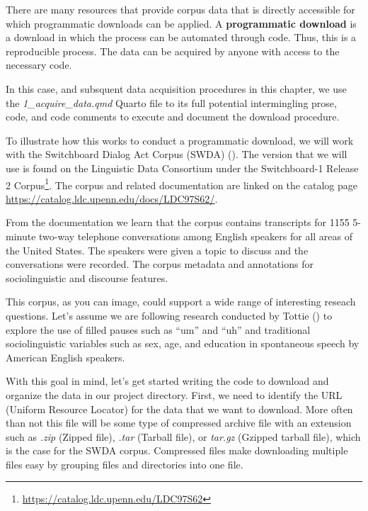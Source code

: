 \documentclass[
  letterpaper,
]{latex/krantz}
\theoremstyle{definition}
\theoremstyle{remark}
\DeclareRobustCommand{\href}[2]{#2\footnote{\url{#1}}}
\begin{document}
There are many resources that provide corpus data that is directly
accessible for which programmatic downloads can be applied. A
\textbf{programmatic download} is a download in which the process can be
automated through code. Thus, this is a reproducible process. The data
can be acquired by anyone with access to the necessary code.

In this case, and subsquent data acquisition procedures in this chapter,
we use the \emph{1\_acquire\_data.qmd} Quarto file to its full potential
intermingling prose, code, and code comments to execute and document the
download procedure.

To illustrate how this works to conduct a programmatic download, we will
work with the Switchboard Dialog Act Corpus (SWDA)
(). The
version that we will use is found on the Linguistic Data Consortium
under the \href{https://catalog.ldc.upenn.edu/LDC97S62}{Switchboard-1
Release 2 Corpus}. The corpus and related documentation are linked on
the catalog page \url{https://catalog.ldc.upenn.edu/docs/LDC97S62/}.

From the documentation we learn that the corpus contains transcripts for
1155 5-minute two-way telephone conversations among English speakers for
all areas of the United States. The speakers were given a topic to
discuss and the conversations were recorded. The corpus metadata and
annotations for sociolinguistic and discourse features.

This corpus, as you can image, could support a wide range of interesting
reseach questions. Let's assume we are following research conducted by
Tottie () to explore the use of filled
pauses such as ``um'' and ``uh'' and traditional sociolinguistic
variables such as sex, age, and education in spontaneous speech by
American English speakers.

With this goal in mind, let's get started writing the code to download
and organize the data in our project directory. First, we need to
identify the URL (Uniform Resource Locator) for the data that we want to
download. More often than not this file will be some type of compressed
archive file with an extension such as \emph{.zip} (Zipped file),
\emph{.tar} (Tarball file), or \emph{tar.gz} (Gzipped tarball file),
which is the case for the SWDA corpus. Compressed files make downloading
multiple files easy by grouping files and directories into one file.
\end{document}

